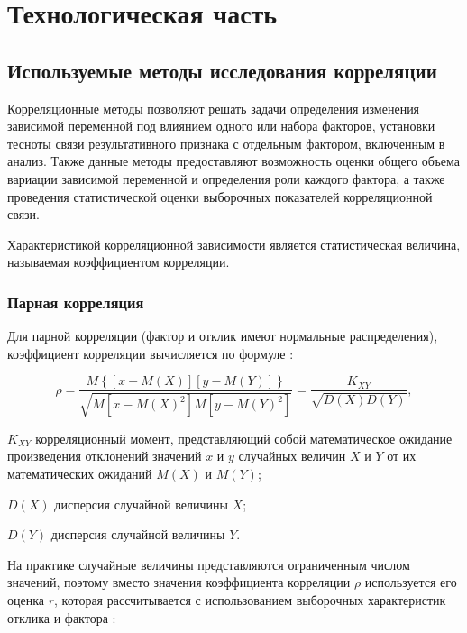 \section{Технологическая часть}

\subsection{Используемые методы исследования корреляции}
Корреляционные методы позволяют решать задачи определения изменения зависимой переменной под влиянием одного или набора факторов, установки тесноты связи результативного признака с отдельным фактором, включенным в анализ. Также данные методы предоставляют возможность оценки общего объема вариации зависимой переменной и определения роли каждого фактора, а также проведения статистической оценки выборочных показателей корреляционной связи. \cite{correlInEco}

Характеристикой корреляционной зависимости является статистическая величина, называемая коэффициентом корреляции. \cite{corelMethod}

\subsubsection{Парная корреляция}

Для парной корреляции (фактор и отклик имеют нормальные распределения), коэффициент корреляции вычисляется по формуле \cite{corelMethod}:

\begin{equation}
\label{eq:corelPara}
\rho = \frac{M\left \{\left[x-M\left(X\right)\right]\left[y-M(Y)\right]\right \}}{\sqrt{M\left[x-M\left(X\right)^2\right]M\left[y-M\left(Y\right)^2\right]}} = \frac{K_{XY}}{\sqrt{D\left(X\right)D\left (Y\right)}},
\end{equation}
\begin{eqexpl}[15mm]
\item{$K_{XY}$} корреляционный момент, представляющий собой математическое ожидание произведения отклонений значений $x$ и $y$ случайных величин $X$ и $Y$ от их математических ожиданий $M(X)$ и $M(Y)$;
\item{$D(X)$} дисперсия случайной величины $X$;
\item{$D(Y)$} дисперсия случайной величины $Y$.
\end{eqexpl}

На практике случайные величины представляются ограниченным числом значений, поэтому вместо значения коэффициента корреляции $\rho$ используется его оценка $r$, которая рассчитывается с использованием выборочных характеристик отклика и фактора \cite{correlMethod}:


